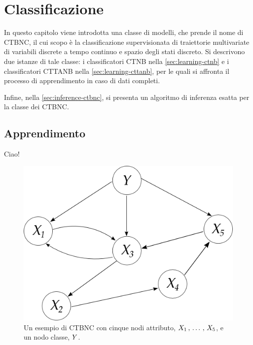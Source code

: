 
\chapter{Classificazione}
\label{cap:ctbnc}
In questo capitolo viene introdotta una classe di modelli, che prende il nome di \acf{CTBNC}, il cui scopo è la classificazione supervisionata di traiettorie multivariate di variabili discrete a tempo continuo e spazio degli stati discreto. Si descrivono due istanze di tale classe: i classificatori \acf{CTNB} nella \autoref{sec:learning-ctnb} e i classificatori \acf{CTTANB} nella \autoref{sec:learning-cttanb}, per le quali si affronta il processo di apprendimento in caso di dati completi.

Infine, nella \autoref{sec:inference-ctbnc}, si presenta un algoritmo di inferenza esatta per la classe dei \acs{CTBNC}.

\section{Apprendimento}
Ciao!

\begin{figure}
\centering
\includegraphics[width=0.9\columnwidth]{immagini/ctbnc}
\caption[Un esempio di \acs{CTBNC}]{Un esempio di \acl{CTBNC} con cinque nodi attributo, $\mathnormal{X}_1\,,\,\dotsc\,,\,\mathnormal{X}_5$, e un nodo classe, $\mathnormal{Y}$.}
\label{fig:galleria}
\end{figure}




